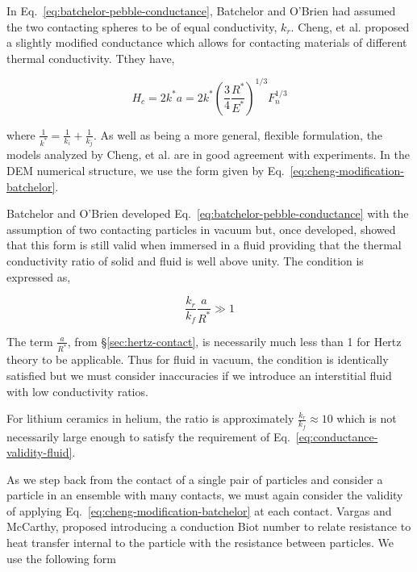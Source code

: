 In Eq.~\ref{eq:batchelor-pebble-conductance}, Batchelor and O'Brien had assumed the two contacting spheres to be of equal conductivity, $k_r$. Cheng, et al.\cite{Cheng19994199} proposed a slightly modified conductance which allows for contacting materials of different thermal conductivity. Tthey have,

\begin{equation}\label{eq:cheng-modification-batchelor}
	H_c = 2k^*a = 2k^* \left(\frac{3}{4}\frac{R^*}{E^*}\right)^{1/3}F_n^{1/3}
\end{equation}

where $\frac{1}{k^*} = \frac{1}{k_i} + \frac{1}{k_j}$. As well as being a more general, flexible formulation, the models analyzed by Cheng, et al.\cite{Cheng19994199} are in good agreement with experiments. In the DEM numerical structure, we use the form given by Eq.~\ref{eq:cheng-modification-batchelor}.

Batchelor and O'Brien developed Eq.~\ref{eq:batchelor-pebble-conductance} with the assumption of two contacting particles in vacuum but, once developed, showed\cite{Batchelor1977} that this form is still valid when immersed in a fluid providing that the thermal conductivity ratio of solid and fluid is well above unity. The condition is expressed as,

\begin{equation}\label{eq:conductance-validity-fluid}
	\frac{ k_r }{ k_f } \frac{a}{R^*} \gg 1
\end{equation}

The term $\frac{a}{R^*}$, from \S\ref{sec:hertz-contact}, is necessarily much less than 1 for Hertz theory to be applicable. Thus for fluid in vacuum, the condition is identically satisfied but we must consider inaccuracies if we introduce an interstitial fluid with low conductivity ratios. 

For lithium ceramics in helium, the ratio is approximately $\frac{k_r}{k_f} \approx 10$ which is not necessarily large enough to satisfy the requirement of Eq.~\ref{eq:conductance-validity-fluid}.

As we step back from the contact of a single pair of particles and consider a particle in an ensemble with many contacts, we must again consider the validity of applying Eq.~\ref{eq:cheng-modification-batchelor} at each contact. Vargas and McCarthy\cite{Vargas2002a}, proposed introducing a conduction Biot number to relate resistance to heat transfer internal to the particle with the resistance between particles. We use the following form

